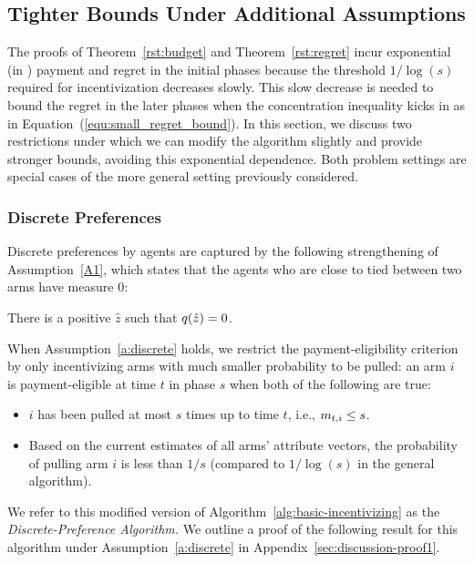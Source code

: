 \subsection{Tighter Bounds Under Additional Assumptions}

The proofs of Theorem~\ref{rst:budget} and Theorem~\ref{rst:regret}
incur exponential (in \ARMNUM) payment and regret in the initial
phases because the threshold $1/\log(s)$ required for incentivization
decreases slowly. 
This slow decrease is needed to bound the regret in the later phases
when the concentration inequality kicks in as in
Equation~(\ref{equ:small_regret_bound}).
In this section, we discuss two restrictions under which we can
modify the algorithm slightly and provide stronger bounds,
avoiding this exponential dependence.
Both problem settings are special cases of the more general
setting previously considered. 

\subsubsection{Discrete Preferences}
\label{subsec:discrete}
Discrete preferences by agents are captured by the following
strengthening of Assumption~\ref{A1},
which states that the agents who are close to tied between
two arms have measure 0:

\begin{assumption}
\label{a:discrete}
There is a positive $\hat{z}$ such that
$q(\hat{z}) = 0$.
\end{assumption}

When Assumption~\ref{a:discrete} holds,
we restrict the payment-eligibility criterion by only incentivizing
arms with much smaller probability to be pulled:
an arm $i$ is payment-eligible at time $t$ in phase $s$ when both of
the following are true: 

\begin{itemize}
\item $i$ has been pulled at most $s$ times up to time $t$,
i.e., $m_{t,i} \leq s$.
\item Based on the current estimates  of all arms' attribute vectors,
the probability of pulling arm $i$ is less than $1/s$
(compared to $1/\log(s)$ in the general algorithm).
\end{itemize}

We refer to this modified version of
Algorithm~\ref{alg:basic-incentivizing} as the
\emph{Discrete-Preference Algorithm.}
We outline a proof of the following result for this algorithm under
Assumption~\ref{a:discrete} in Appendix~\ref{sec:discussion-proof1}.

